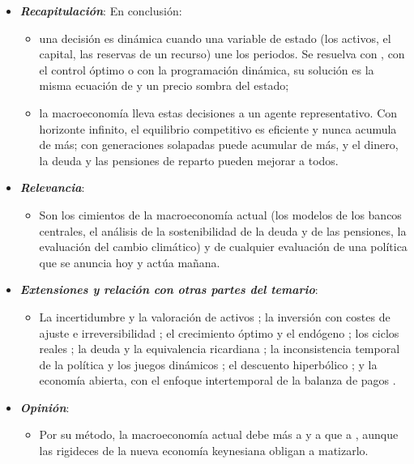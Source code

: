 \documentclass[11pt]{article}
\begin{document}
\begin{itemize}
\item \textbf{\emph{Recapitulación}}: En conclusión:
  \begin{itemize}
  \item una decisión es dinámica cuando una variable de estado (los activos, el capital, las reservas de un recurso) une los periodos. Se resuelva con , con el control óptimo o con la programación dinámica, su solución es la misma ecuación de  y un precio sombra del estado;
  \item la macroeconomía lleva estas decisiones a un agente representativo. Con horizonte infinito, el equilibrio competitivo es eficiente y nunca acumula de más; con generaciones solapadas puede acumular de más, y el dinero, la deuda y las pensiones de reparto pueden mejorar a todos.
  \end{itemize}
\item \textbf{\emph{Relevancia}}:
  \begin{itemize}
  \item Son los cimientos de la macroeconomía actual (los modelos de los bancos centrales, el análisis de la sostenibilidad de la deuda y de las pensiones, la evaluación del cambio climático) y de cualquier evaluación de una política que se anuncia hoy y actúa mañana.
  \end{itemize}
\item \textbf{\emph{Extensiones y relación con otras partes del temario}}:
  \begin{itemize}
  \item La incertidumbre y la valoración de activos ; la inversión con costes de ajuste e irreversibilidad ; el crecimiento óptimo y el endógeno  ; los ciclos reales ; la deuda y la equivalencia ricardiana ; la inconsistencia temporal de la política  y los juegos dinámicos ; el descuento hiperbólico ; y la economía abierta, con el enfoque intertemporal de la balanza de pagos .
  \end{itemize}
\item \textbf{\emph{Opinión}}:
  \begin{itemize}
  \item Por su método, la macroeconomía actual debe más a  y a  que a , aunque las rigideces de la nueva economía keynesiana obligan a matizarlo.


\end{itemize}
\end{itemize}
\end{document}
